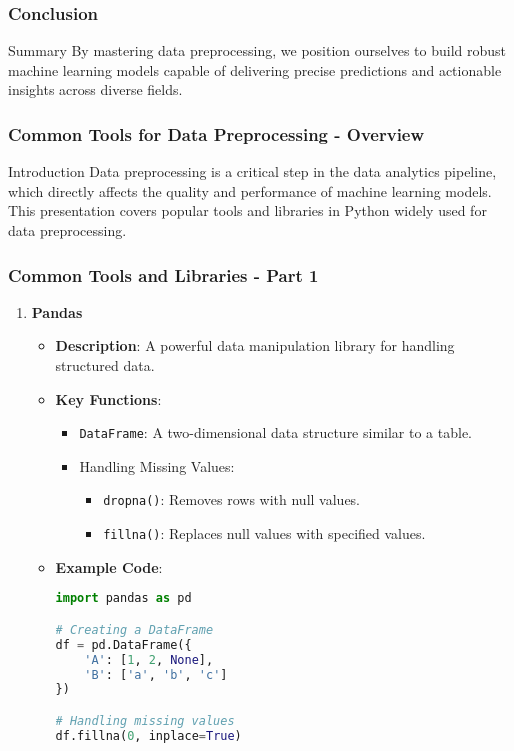 \documentclass{beamer}
\begin{document}
\begin{frame}[fragile]
    \frametitle{Conclusion}
    \begin{block}{Summary}
        By mastering data preprocessing, we position ourselves to build robust machine learning models capable of delivering precise predictions and actionable insights across diverse fields.
    \end{block}
\end{frame}

\begin{frame}
    \frametitle{Common Tools for Data Preprocessing - Overview}
    \begin{block}{Introduction}
        Data preprocessing is a critical step in the data analytics pipeline, which directly affects the quality and performance of machine learning models. This presentation covers popular tools and libraries in Python widely used for data preprocessing.
    \end{block}
\end{frame}

\begin{frame}[fragile]
    \frametitle{Common Tools and Libraries - Part 1}
    \begin{enumerate}
        \item \textbf{Pandas}
            \begin{itemize}
                \item \textbf{Description}: A powerful data manipulation library for handling structured data.
                \item \textbf{Key Functions}:
                    \begin{itemize}
                        \item \texttt{DataFrame}: A two-dimensional data structure similar to a table.
                        \item Handling Missing Values: 
                        \begin{itemize}
                            \item \texttt{dropna()}: Removes rows with null values.
                            \item \texttt{fillna()}: Replaces null values with specified values.
                        \end{itemize}
                    \end{itemize}
                \item \textbf{Example Code}:
                    \begin{lstlisting}[language=Python]
import pandas as pd

# Creating a DataFrame
df = pd.DataFrame({
    'A': [1, 2, None],
    'B': ['a', 'b', 'c']
})

# Handling missing values
df.fillna(0, inplace=True)
                    \end{lstlisting}
            \end{itemize}
    \end{enumerate}
\end{frame}
\end{document}
